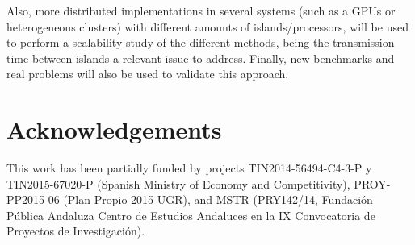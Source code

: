 \documentclass[preprint]{elsarticle}
\begin{document}
Also, more distributed implementations in several systems (such as a
GPUs or heterogeneous clusters) with different amounts of
islands/processors, will be used to perform a scalability study of the
different methods, being the transmission time between islands a
relevant issue to address. Finally, new benchmarks and real problems
will also be  used to validate this approach.  



\section*{Acknowledgements}
This work has been partially funded by projects TIN2014-56494-C4-3-P y TIN2015-67020-P (Spanish Ministry of Economy and Competitivity), PROY-PP2015-06 (Plan Propio 2015 UGR),  and  MSTR (PRY142/14, Fundaci\'on P\'ublica Andaluza Centro de Estudios Andaluces en la IX Convocatoria de Proyectos de Investigaci\'on).










\end{document}
